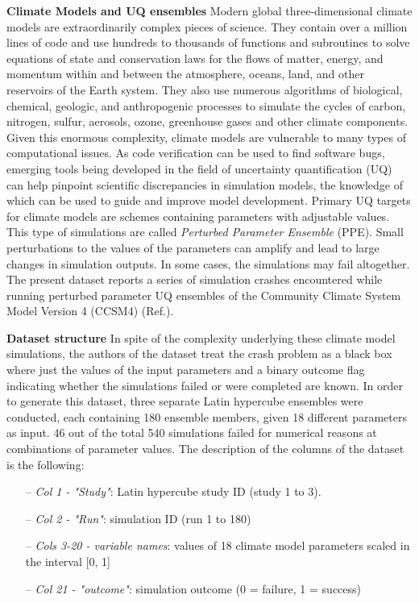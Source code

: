\documentclass[english,notitlepage,reprint,nofootinbib]{revtex4-1}  %
\begin{document}
\textbf{Climate Models and UQ ensembles} Modern global three-dimensional climate models are extraordinarily complex pieces of science. They contain over a million lines of code and use hundreds to thousands of functions and subroutines to solve equations of state and conservation laws for the flows of matter, energy, and momentum within and between the atmosphere, oceans, land, and other reservoirs of the Earth system. They also use numerous algorithms of biological, chemical, geologic, and anthropogenic processes to simulate the cycles of carbon, nitrogen, sulfur, aerosols, ozone, greenhouse gases and other climate components. Given this enormous complexity, climate models are vulnerable to many types of computational issues. As code verification can be used to find software bugs, emerging tools being developed in the field of uncertainty quantification (UQ) can help pinpoint scientific discrepancies in simulation models, the knowledge of which can be used to guide and improve model development. Primary UQ targets for climate models are schemes containing parameters with adjustable values. This type of simulations are called \textit{Perturbed Parameter Ensemble} (PPE). Small perturbations to the values of the parameters can amplify and lead to large changes in simulation outputs. In some cases, the simulations may fail altogether. The present dataset reports a series of simulation crashes encountered while running perturbed parameter UQ ensembles of the Community Climate System Model Version 4 (CCSM4) (Ref.\cite{failure}).

\textbf{Dataset structure}
In spite of the complexity underlying these climate model simulations, the authors of the dataset treat the crash problem as a black box where just the values of the input parameters and a binary outcome flag indicating whether the simulations failed or were completed are known. In order to generate this dataset, three separate Latin hypercube ensembles were conducted, each containing 180 ensemble members, given 18 different parameters as input. 46 out of the total 540 simulations failed for numerical reasons at combinations of parameter values.
The description of the columns of the dataset is the following:

\begin{itemize}
    \item[–] \textit{Col 1 - "Study"}: Latin hypercube study ID (study 1 to 3).
    \item[–] \textit{Col 2 - "Run"}: simulation ID (run 1 to 180)
    \item[–] \textit{Cols 3-20 - variable names}: values of 18 climate model parameters scaled in the interval [0, 1]
    \item[–] \textit{Col 21 - "outcome"}: simulation outcome (0 = failure, 1 = success)
\end{itemize}
\end{document}
